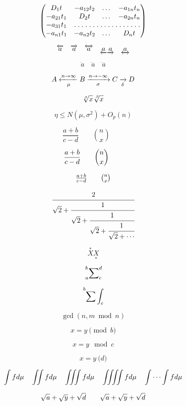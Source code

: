 \documentclass[11pt]{article}
\begin{document}
$$\begin{pmatrix}
D_1t & -a_{12}t_2 & \dots & -a_{1n}t_n \\
-a_{21}t_1 & D_2t & \dots & -a_{2n}t_n \\
-a_{31}t_1 & \hdotsfor[1.5]{3} \\
-a_{n1}t_1 & -a_{n2}t_2 & \dots & D_nt
\end{pmatrix}$$

$$\overleftarrow{a} \quad \overrightarrow{a} \quad \overleftrightarrow{a} \quad \underleftarrow{a} \underrightarrow{a} \quad \underleftrightarrow{a}$$

$$\ddot a \quad \dddot a \quad \ddddot a$$

$$A \xleftarrow[\mu]{n\rightarrow \infty} B \xrightarrow[\sigma]{n \rightarrow -\infty} C \xrightarrow[\delta]{\null} D$$

$$\sqrt[\beta]{x} \sqrt[\leftroot{-2}\uproot{2}\beta]{x}$$

$$\boxed{\eta \leq N(\mu, \sigma^2)+O_p(n)}$$

$$\frac{a+b}{c-d} \qquad \binom{n}{x} \qquad$$

$$\dfrac{a+b}{c-d} \qquad \dbinom{n}{x} \qquad$$

$$\tfrac{a+b}{c-d} \qquad \tbinom{n}{x}$$

$$\cfrac{2}{\sqrt{2}+\cfrac{1}{\sqrt{2}+\cfrac{1}{\sqrt{2}+\cfrac{1}{\sqrt{2}+\cdots}}}}$$

$$\overset{*}{X} \underset{*}{X}$$

$$\sideset{_a^b}{_c^d}\sum$$

$$\sideset{_{\null}^b}{_c^{\null}}{\sum\int}$$





$$\gcd(n, m \bmod n)$$

$$x=y \pmod b$$

$$x =y \mod c$$

$$x=y \pod d$$

\begin{equation*}
\int f d\mu \quad
\iint f d\mu \quad
\iiint f d\mu \quad
\iiiint f d\mu \quad \idotsint fd\mu
\end{equation*}

$$\sqrt{a} + \sqrt{y} + \sqrt{d} \qquad 
\sqrt{\smash[b] a} + \sqrt{\smash[b] y} + \sqrt{\smash[b] d}$$
\end{document}
